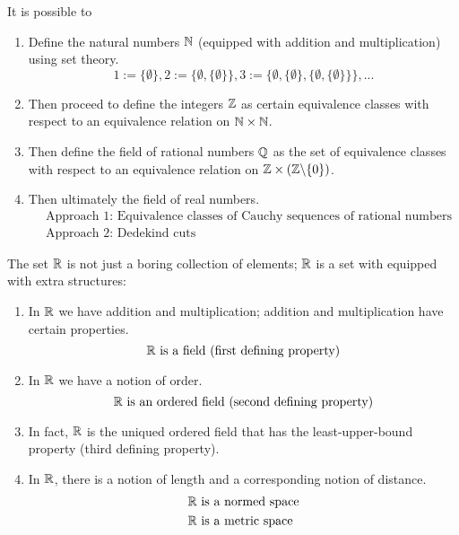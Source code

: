 \begin{remark}
    It is possible to 
    \begin{enumerate}
        \item Define the natural numbers $\mathbb{N}$ (equipped with addition and multiplication) using set theory.
        $$1:= \{\emptyset\}, 2:= \{\emptyset, \{\emptyset\}\}, 3:= \{\emptyset, \{\emptyset\}, \{\emptyset, \{\emptyset\}\}\}, ...$$
        \item Then proceed to define the integers $\mathbb{Z}$ as certain equivalence classes with respect to an equivalence relation on $\mathbb{N} \times \mathbb{N}$.
        \item Then define the field of rational numbers $\mathbb{Q}$ as the set of equivalence classes with respect to an equivalence relation on $\mathbb{Z} \times (\mathbb{Z} \backslash \{0\})$.
        \item Then ultimately the field of real numbers.
        \begin{align*}
            &\text{Approach 1: Equivalence classes of Cauchy sequences of rational numbers} \\
            &\text{Approach 2: Dedekind cuts}
        \end{align*}
    \end{enumerate}
\end{remark}

\begin{observation}
    The set $\mathbb{R}$ is not just a boring collection of elements; $\mathbb{R}$ is a set with equipped with extra structures:
    \begin{enumerate}
        \item In $\mathbb{R}$ we have addition and multiplication; addition and multiplication have certain properties.
        $$\text{$\mathbb{R}$ is a field (first defining property)}$$
        \item In $\mathbb{R}$ we have a notion of order.
        $$\text{$\mathbb{R}$ is an ordered field (second defining property)}$$
        \item In fact, $\mathbb{R}$ is the uniqued ordered field that has the least-upper-bound property (third defining property).
        \item In $\mathbb{R}$, there is a notion of length and a corresponding notion of distance.
        \begin{align*}
            &\text{$\mathbb{R}$ is a normed space} \\
            &\text{$\mathbb{R}$ is a metric space}
        \end{align*}
    \end{enumerate}
\end{observation}

